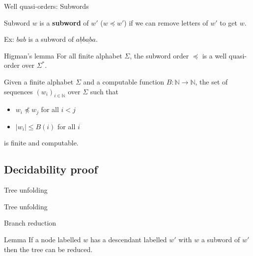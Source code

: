 \documentclass{beamer}
\begin{document}
\begin{frame}{Well quasi-orders: Subwords}
	
	\begin{block}{Subword}
		$w$ is a \textbf{subword} of $w'$ ($w \preceq w'$) if we can remove letters of $w'$ to get $w$.
	\end{block}
	
	Ex: $bab$ is a subword of $a\underline{b}b\underline{ab}a$.
	
	\pause
	\begin{block}{Higman's lemma}
		For all finite alphabet $\Sigma$, the subword order $\preceq$ is a well quasi-order over $\Sigma^*$.
	\end{block}

	
	\pause
	\begin{framed}
	Given a finite alphabet $\Sigma$ and a computable function $B : \mathbb{N} \to \mathbb{N}$, the set of sequences $(w_i)_{i \in \mathbb{N}}$ over $\Sigma$ such that
	\begin{itemize}
		\item $w_i \npreceq w_j$ for all $i<j$ 
		\item $|w_i| \leq B(i)$ for all $i$
	\end{itemize}
is finite and computable.
\end{framed}

\end{frame}

\subsection{Decidability proof}

\begin{frame}
	\tableofcontents[currentsubsection]
\end{frame}

\begin{frame}{Tree unfolding}
	
	
	
\end{frame}

\begin{frame}{Tree unfolding}
	
	
\end{frame}

\begin{frame}{Branch reduction}
	
	\begin{block}{Lemma}
		If a node labelled $w$ has a descendant labelled $w'$ with $w$ a subword of $w'$ then the tree can be reduced.
	\end{block}
	
	
\end{frame}
\end{document}
